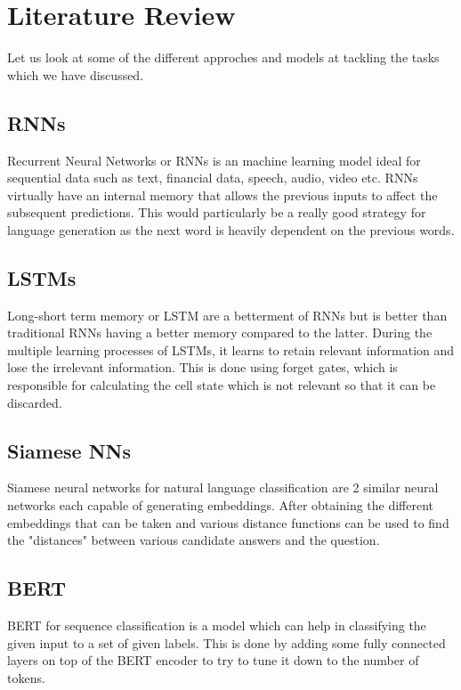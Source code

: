 
\chapter{Literature Review} %

\label{Chapter3} %


Let us look at some of the different approches and models at tackling the tasks which we have discussed.
\section{RNNs}
Recurrent Neural Networks or RNNs is an machine learning model ideal for sequential data such as text, financial data, speech, audio, video etc. RNNs virtually have an internal memory that allows the previous inputs to affect the subsequent predictions. This would particularly be a really good strategy for language generation as the next word is heavily dependent on the previous words.
\section{LSTMs}
Long-short term memory or LSTM are a betterment of RNNs but is better than traditional RNNs having a better memory compared to the latter. During the multiple learning processes of LSTMs, it learns to retain relevant information and lose the irrelevant information. This is done using forget gates, which is responsible for calculating the cell state which is not relevant so that it can be discarded.
\section{Siamese NNs}
Siamese neural networks for natural language classification are 2 similar neural networks each capable of generating embeddings. After obtaining the different embeddings that can be taken and various distance functions can be used to find the "distances" between various candidate answers and the question.
\section{BERT}
BERT\cite{DBLP:journals/corr/abs-1810-04805} for sequence classification is a model which can help in classifying the given input to a set of given labels. This is done by adding some fully connected layers on top of the BERT encoder to try to tune it down to the number of tokens.
